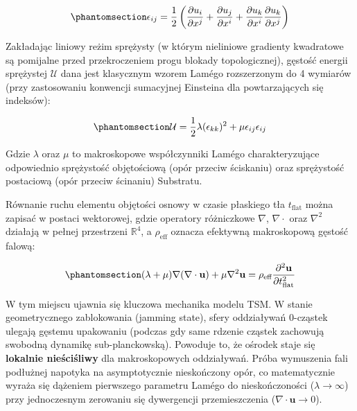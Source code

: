 \documentclass[
  polish,
  letterpaper,
  DIV=11,
  numbers=noendperiod,
  oneside]{scrartcl}
\begin{document}
\begin{equation}\protect\phantomsection\label{eq-sek131-4wym-tensor-odkszt}{\epsilon_{ij} = \frac{1}{2} \left( \frac{\partial u_i}{\partial x^j} + \frac{\partial u_j}{\partial x^i} + \frac{\partial u_k}{\partial x^i} \frac{\partial u_k}{\partial x^j} \right)}\end{equation}

Zakładając liniowy reżim sprężysty (w którym nieliniowe gradienty
kwadratowe są pomijalne przed przekroczeniem progu blokady
topologicznej), gęstość energii sprężystej \(\mathcal{U}\) dana jest
klasycznym wzorem Lamégo rozszerzonym do 4 wymiarów (przy zastosowaniu
konwencji sumacyjnej Einsteina dla powtarzających się indeksów):

\begin{equation}\protect\phantomsection\label{eq-sek131-gest-energ-sprezU}{\mathcal{U} = \frac{1}{2} \lambda (\epsilon_{kk})^2 + \mu \epsilon_{ij} \epsilon_{ij}}\end{equation}

Gdzie \(\lambda\) oraz \(\mu\) to makroskopowe współczynniki Lamégo
charakteryzujące odpowiednio sprężystość objętościową (opór przeciw
ściskaniu) oraz sprężystość postaciową (opór przeciw ścinaniu)
Substratu.

Równanie ruchu elementu objętości osnowy w czasie płaskiego tła
\(t_{\text{flat}}\) można zapisać w postaci wektorowej, gdzie operatory
różniczkowe \(\nabla\), \(\nabla \cdot\) oraz \(\nabla^2\) działają w
pełnej przestrzeni \(\mathbb{R}^4\), a \(\rho_{\text{eff}}\) oznacza
efektywną makroskopową gęstość falową:

\begin{equation}\protect\phantomsection\label{eq-sek131-rown-ruchu-elemVosn}{(\lambda + \mu) \nabla (\nabla \cdot \mathbf{u}) + \mu \nabla^2 \mathbf{u} = \rho_{\text{eff}} \frac{\partial^2 \mathbf{u}}{\partial t_{\text{flat}}^2}}\end{equation}

W tym miejscu ujawnia się kluczowa mechanika modelu TSM. W stanie
geometrycznego zablokowania (jamming state), sfery oddziaływań 0-cząstek
ulegają gęstemu upakowaniu (podczas gdy same rdzenie cząstek zachowują
swobodną dynamikę sub-planckowską). Powoduje to, że ośrodek staje się
\textbf{lokalnie nieściśliwy} dla makroskopowych oddziaływań. Próba
wymuszenia fali podłużnej napotyka na asymptotycznie nieskończony opór,
co matematycznie wyraża się dążeniem pierwszego parametru Lamégo do
nieskończoności (\(\lambda \to \infty\)) przy jednoczesnym zerowaniu się
dywergencji przemieszczenia (\(\nabla \cdot \mathbf{u} \to 0\)).
\end{document}
